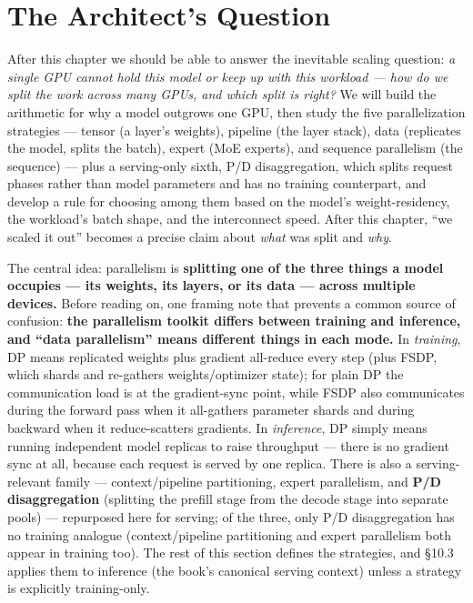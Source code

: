 \section*{The Architect's Question}\label{the-architects-question}

After this chapter we should be able to answer the inevitable scaling
question: \emph{a single GPU cannot hold this model or keep up with this
workload --- how do we split the work across many GPUs, and which split
is right?} We will build the arithmetic for why a model outgrows one
GPU, then study the five parallelization strategies --- tensor (a
layer's weights), pipeline (the layer stack), data (replicates the
model, splits the batch), expert (MoE experts), and sequence parallelism
(the sequence) --- plus a serving-only sixth, P/D disaggregation, which
splits request phases rather than model parameters and has no training
counterpart, and develop a rule for choosing among them based on the
model's weight-residency, the workload's batch shape, and the
interconnect speed. After this chapter, ``we scaled it out'' becomes a
precise claim about \emph{what} was split and \emph{why}.

\label{concept}


The central idea: parallelism is \textbf{splitting one of the three
things a model occupies --- its weights, its layers, or its data ---
across multiple devices.} Before reading on, one framing note that
prevents a common source of confusion: \textbf{the parallelism toolkit
differs between training and inference, and ``data parallelism'' means
different things in each mode.} In \emph{training}, DP means replicated
weights plus gradient all-reduce every step (plus FSDP, which shards and
re-gathers weights/optimizer state); for plain DP the communication load
is at the gradient-sync point, while FSDP also communicates during the
forward pass when it all-gathers parameter shards and during backward
when it reduce-scatters gradients. In \emph{inference}, DP simply means
running independent model replicas to raise throughput --- there is no
gradient sync at all, because each request is served by one replica.
There is also a serving-relevant family --- context/pipeline
partitioning, expert parallelism, and \textbf{P/D disaggregation}
(splitting the prefill stage from the decode stage into separate pools)
--- repurposed here for serving; of the three, only P/D disaggregation
has no training analogue (context/pipeline partitioning and expert
parallelism both appear in training too). The rest of this section
defines the strategies, and §10.3 applies them to inference (the book's
canonical serving context) unless a strategy is explicitly
training-only.

